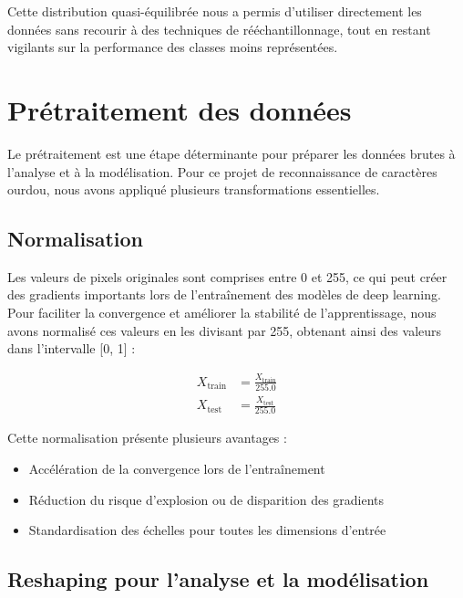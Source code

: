 \begin{flushleft}
Cette distribution quasi-équilibrée nous a permis d'utiliser directement les données sans recourir à des techniques de rééchantillonnage, tout en restant vigilants sur la performance des classes moins représentées.
\end{flushleft}

\section{Prétraitement des données}
\begin{flushleft}
Le prétraitement est une étape déterminante pour préparer les données brutes à l'analyse et à la modélisation. Pour ce projet de reconnaissance de caractères ourdou, nous avons appliqué plusieurs transformations essentielles.
\end{flushleft}

\subsection{Normalisation}
\begin{flushleft}
Les valeurs de pixels originales sont comprises entre 0 et 255, ce qui peut créer des gradients importants lors de l'entraînement des modèles de deep learning. Pour faciliter la convergence et améliorer la stabilité de l'apprentissage, nous avons normalisé ces valeurs en les divisant par 255, obtenant ainsi des valeurs dans l'intervalle [0, 1] :
\end{flushleft}

\[
\begin{aligned}
X_{\text{train}} &= \frac{X_{\text{train}}}{255.0} \\
X_{\text{test}} &= \frac{X_{\text{test}}}{255.0}
\end{aligned}
\]

Cette normalisation présente plusieurs avantages :

\begin{itemize}
\item Accélération de la convergence lors de l'entraînement
\item Réduction du risque d'explosion ou de disparition des gradients
\item Standardisation des échelles pour toutes les dimensions d'entrée
\end{itemize}

\subsection{Reshaping pour l'analyse et la modélisation}

